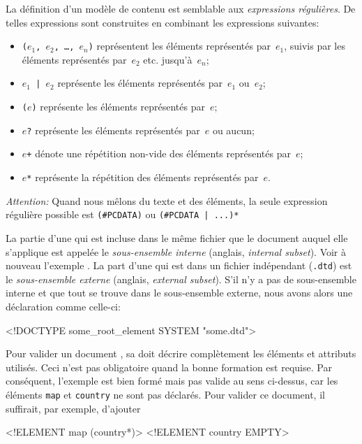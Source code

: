 La définition d'un modèle de contenu est semblable aux
\emph{expressions régulières}. De telles expressions sont construites
en combinant les expressions suivantes:
\begin{itemize}

  \item \texttt{(\(e_1\), \(e_2\), \dots, \(e_n\))} représentent les
    éléments représentés par~\(e_1\), suivis par les éléments
    représentés par~\(e_2\) etc. jusqu'à~\(e_n\);

  \item \texttt{\(e_1\) | \(e_2\)} représente les éléments représentés
    par~\(e_1\) ou~\(e_2\);

  \item \texttt{(\(e\))} représente les éléments représentés par~\(e\);

  \item \texttt{\(e\)?} représente les éléments représentés par~\(e\)
    ou aucun;

  \item \texttt{\(e\)+} dénote une répétition non-vide des
    éléments représentés par~\(e\);

  \item \texttt{\(e\)*} représente la répétition des éléments
    représentés par~\(e\).

\end{itemize}
\emph{Attention:} Quand nous mêlons du texte et des éléments, la seule
expression régulière possible est \verb|(#PCDATA)| ou
\verb/(#PCDATA | ...)*/

La partie d'une \DTD qui est incluse dans le même fichier que le
document \XML auquel elle s'applique est appelée le
\emph{sous-ensemble interne} (anglais, \emph{internal subset}). Voir à
nouveau l'exemple . La part d'une \DTD
qui est dans un fichier indépendant (\texttt{.dtd}) est le
\emph{sous-ensemble externe} (anglais, \emph{external subset}). S'il
n'y a pas de sous-ensemble interne et que tout se trouve dans le
sous-ensemble externe, nous avons alors une déclaration comme
celle-ci:
\begin{sverb}
<!DOCTYPE some_root_element SYSTEM "some.dtd">
\end{sverb}
Pour valider un document \XML, sa \DTD doit décrire complètement les
éléments et attributs utilisés. Ceci n'est pas obligatoire quand la
bonne formation est requise. Par conséquent, l'exemple
 est bien formé mais pas valide au sens
ci-dessus, car les éléments \texttt{map} et \texttt{country} ne sont
pas déclarés. Pour valider ce document, il suffirait, par exemple,
d'ajouter
\begin{sverb}
<!ELEMENT map (country*)>
<!ELEMENT country EMPTY>
\end{sverb}


